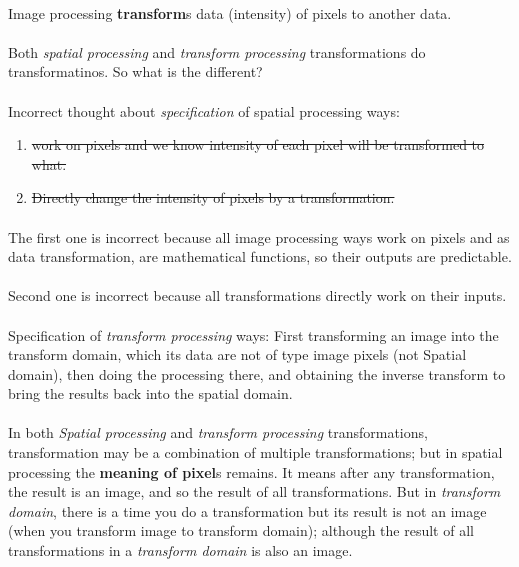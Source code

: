 \paragraph*{} Image processing \textbf{transform}s data (intensity) of pixels to
another data.

\paragraph*{}Both \emph{spatial processing} and \emph{transform processing}
transformations do transformatinos. So what is the different? 

\paragraph*{} Incorrect thought about \emph{specification} of spatial processing
ways:
\begin{enumerate}
    \item \st{work on pixels and we know intensity of each pixel will be
    transformed to what.}
    \item \st{Directly change the intensity of pixels by a transformation.}
\end{enumerate}

\paragraph{} The first one is incorrect because all image processing ways work
on pixels and as data transformation, are mathematical functions, so  their
outputs are predictable. 

\paragraph{} Second one is incorrect because all transformations directly work
on their inputs.

\paragraph*{}{Specification of \emph{transform processing} ways: \newline
First transforming an image into the transform domain, which its data are not of
type image pixels (not Spatial domain), then doing the processing there, and
obtaining the inverse transform to bring the results back into the spatial
domain.} 

\paragraph*{} In both \emph{Spatial processing} and \emph{transform processing}
transformations, transformation may be a combination of multiple
transformations; but in spatial processing the \textbf{meaning of pixel}s
remains. It means after any transformation, the result is an image, and so the
result of all transformations. But in \emph{transform domain}, there is a time
you do a transformation but its result is not an image (when you transform
image to transform domain); although the result of all transformations
in a \emph{transform domain} is also an image.

